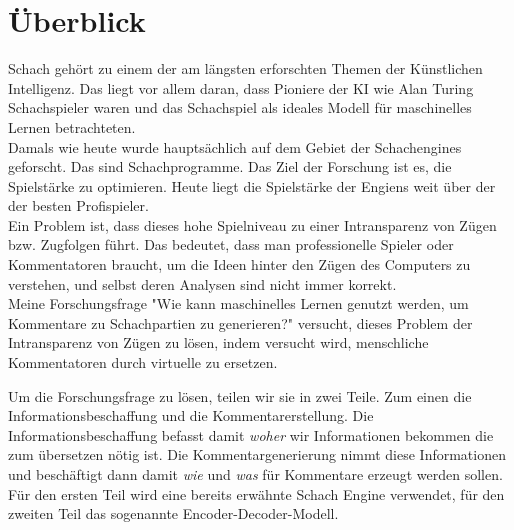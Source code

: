 \section{Überblick}

Schach gehört zu einem der am längsten erforschten Themen der Künstlichen Intelligenz. Das liegt vor allem daran, dass Pioniere der KI wie Alan Turing Schachspieler waren und das Schachspiel als ideales Modell für maschinelles Lernen betrachteten.\\

Damals wie heute wurde hauptsächlich auf dem Gebiet der Schachengines geforscht. Das sind Schachprogramme. Das Ziel der Forschung ist es, die Spielstärke zu optimieren. Heute liegt die Spielstärke der Engiens weit über der der besten Profispieler.\\

Ein Problem ist, dass dieses hohe Spielniveau zu einer Intransparenz von Zügen bzw. Zugfolgen führt. Das bedeutet, dass man professionelle Spieler oder Kommentatoren braucht, um die Ideen hinter den Zügen des Computers zu verstehen, und selbst deren Analysen sind nicht immer korrekt.\\

Meine Forschungsfrage "Wie kann maschinelles Lernen genutzt werden, um Kommentare zu Schachpartien zu generieren?" versucht, dieses Problem der Intransparenz von Zügen zu lösen, indem versucht wird, menschliche Kommentatoren durch virtuelle zu ersetzen.

\newpage

Um die Forschungsfrage zu lösen, teilen wir sie in zwei Teile. Zum einen die Informationsbeschaffung und die Kommentarerstellung. Die Informationsbeschaffung befasst damit \textit{woher} wir Informationen bekommen die zum übersetzen nötig ist. Die Kommentargenerierung nimmt diese Informationen und beschäftigt dann damit \textit{wie} und \textit{was} für Kommentare erzeugt werden sollen.\\

Für den ersten Teil wird eine bereits erwähnte Schach Engine verwendet, für den zweiten Teil das sogenannte Encoder-Decoder-Modell.\\

